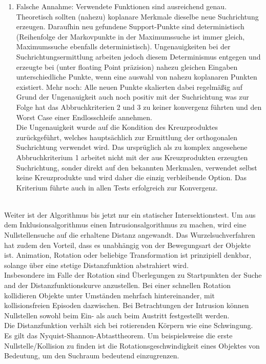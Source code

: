 \begin{enumerate}
	\item Falsche Annahme: Verwendete Funktionen sind ausreichend genau.\\
		Theoretisch sollten (nahezu) koplanare Merkmale dieselbe neue Suchrichtung erzeugen. Daraufhin neu gefundene Support-Punkte sind deterministisch (Reihenfolge der Markovpunkte in der Maximumssuche ist immer gleich, Maximumssuche ebenfalls deterministisch). Ungenauigkeiten bei der Suchrichtungsermittlung arbeiten jedoch diesem Determinismus entgegen und erzeugte bei (unter floating Point präzision) nahezu gleichen Eingaben unterschiedliche Punkte, wenn eine auswahl von nahezu koplanaren Punkten existiert. Mehr noch: Alle neuen Punkte skalierten dabei regelmäßig auf Grund der Ungenauigkeit auch noch positiv mit der Suchrichtung was zur Folge hat das Abbruchkriterien 2 und 3 zu keiner konvergenz führten und den Worst Case einer Endlosschleife annehmen.\\
	Die Ungenauigkeit wurde auf die Kondition des Kreuzproduktes zurückgeführt, welches hauptsächlich zur Ermittlung der orthogonalen Suchrichtung verwendet wird. Das ursprüglich als zu komplex angesehene Abbruchkriterium 1 arbeitet nicht mit der aus Kreuzprodukten erzeugten Suchrichtung, sonder direkt auf den bekannten Merkmalen, verwendet selbst keine Kreuzprodukte und wird daher die einzig verbleibende Option. Das Kriterium führte auch in allen Tests erfolgreich zur Konvergenz.
\end{enumerate}
~\\
Weiter ist der Algorithmus bis jetzt nur ein statischer Intersektionstest. Um aus dem Inklusionsalgorithmus einen Intrusionsalgorithmus zu machen, wird eine Nullstellensuche auf die erhaltene Distanz angewandt.
Das Wurzelsuchverfahren hat zudem den Vorteil, dass es unabhängig von der Bewegungsart der Objekte ist. Animation, Rotation oder beliebige Transformation ist prinzipiell denkbar, solange über eine stetige Distanzfunktion abstrahiert wird.\\
Insbesondere im Falle der Rotation sind Überlegungen zu Startpunkten der Suche and der Distanzfunktionskurve anzustellen. Bei einer schnellen Rotation kollidieren Objekte unter Umständen mehrfach hintereinander, mit kollisionsfreien Episoden dazwischen. Bei Betrachtungen der Intrusion können Nullstellen sowohl beim Ein- als auch beim Austritt festgestellt werden.\\
Die Distanzfunktion verhält sich bei rotierenden Körpern wie eine Schwingung. Es gilt das Nyquist-Shannon-Abtasttheorem. Um beispielsweise die erste Nullstelle/Kollision zu finden ist die Rotationsgeschwindigkeit eines Objektes von Bedeutung, um den Suchraum bedeutend einzugrenzen.\\
